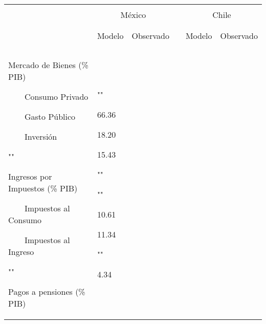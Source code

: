 \documentclass[10pt,a4paper]{report}
\newcommand{\tabitem}{~~\llap{\textbullet}~~}
\begin{document}
\begin{longtable}{p{5cm} p{1cm} p{1cm} p{1cm} p{1cm} p{1cm}}  
\\[-1.8ex]\hline 
\endhead
\hline \\[-1.8ex] 
\multicolumn{1}{c}{} & \multicolumn{2}{c}{México} & \multicolumn{1}{c}{} & \multicolumn{2}{c}{Chile} \\
\\ 
\cline{2-3}
\cline{5-6}
\\ 
          & Modelo  & Observado & & Modelo & Observado\\
\\
\hline \\[-1ex] 


Mercado de Bienes (\% PIB)

\par\tabitem Consumo Privado

\par\tabitem Gasto Público

\par\tabitem Inversión

\par ""

Ingresos por Impuestos (\% PIB) 

\par\tabitem Impuestos al Consumo 

\par\tabitem Impuestos al Ingreso

\par ""

Pagos a pensiones (\% PIB)

&
\par ""
\par 66.36
\par 18.20
\par 15.43
\par ""
\par ""
\par 10.61
\par 11.34
\par ""
\par 4.34


\end{longtable}
\end{document}
